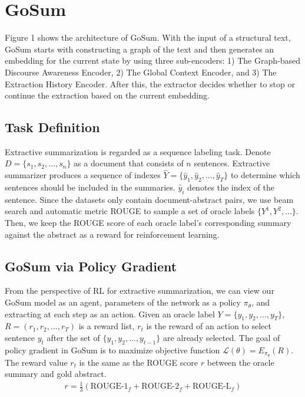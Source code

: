 \section{GoSum }
\label{sec:method}

Figure 1 shows the architecture of GoSum. With the input of a structural text,  GoSum starts with constructing a  graph of the text
and then generates  an embedding for the current state by using three sub-encoders: 1) The Graph-based Discourse Awareness Encoder, 2) The Global Context Encoder, and 3) The Extraction History Encoder. After this, the extractor decides whether to stop or continue the extraction based on the current embedding. 

\subsection{Task Definition}
Extractive summarization is regarded as a sequence labeling task.
Denote $D=\{s_1,s_2,...,s_n\}$ as a document that consists of $n$ sentences. Extractive summarizer produces a sequence of indexes $\hat{Y} = \{\hat{y}_1,\hat{y}_2,...,\hat{y}_T\}$ to determine which sentences should be included in the summaries.
$\hat{y}_i$ denotes the index of the sentence.
Since the datasets only contain document-abstract pairs, we use beam search and automatic metric ROUGE to sample a set of oracle labels $\{Y^1,Y^2,...\}$.
Then, we keep the ROUGE score of each oracle label's corresponding summary against the abstract as a reward for reinforcement learning.

\subsection{GoSum via Policy Gradient}
From the perspective of RL for extractive summarization, we can view our GoSum model  as an agent, parameters of the network as a policy $\pi_{\theta}$, and  extracting at each step  as an action.
Given an oracle label $Y = \{y_1,y_2,...,y_T\}$, $R=(r_1,r_2,...,r_T)$ is a reward list, $r_t$ is the reward of an action to select sentence $y_t$ after the set of $\{y_1,y_2,...,y_{t-1}\}$ are already selected.
The goal of policy gradient in GoSum is to maximize objective function $\mathcal{L}(\theta)=E_{\pi_{\theta}} (R)$.
The reward value $r_t$ is the same as the ROUGE \cite{rouge_2004} score $r$ between the oracle summary and gold abstract.
\begin{align}
    r = \frac{1}{3} \left(  \text{ROUGE-1}_f + \text{ROUGE-2}_f + \text{ROUGE-L}_f  \right)
\end{align}


